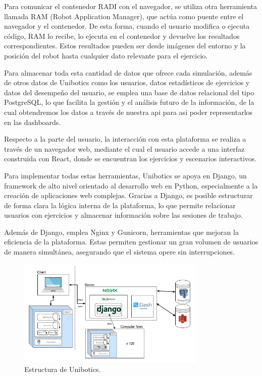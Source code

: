 \documentclass[a4paper, 12pt]{book}
\begin{document}
Para comunicar el contenedor RADI con el navegador, se utiliza otra herramienta llamada RAM (Robot Application Manager), que actúa como puente entre el navegador y el contenedor. De esta forma, cuando el usuario modifica o ejecuta código, RAM lo recibe, lo ejecuta en el contenedor y devuelve los resultados correspondientes. Estos resultados pueden ser desde imágenes del entorno y la posición del robot hasta cualquier dato relevante para el ejercicio. 

Para almacenar toda esta cantidad de datos que ofrece cada simulación, además de otros datos de Unibotics como los usuarios, datos estadísticos de ejercicios y datos del desempeño del usuario, se emplea una base de datos relacional del tipo PostgreSQL, lo que facilita la gestión y el análisis futuro de la información, de la cual obtendremos los datos a través de nuestra api para asi poder representarlos en las dashboards.

Respecto a la parte del usuario, la interacción con esta plataforma se realiza a través de un navegador web, mediante el cual el usuario accede a una interfaz construida con React, donde se encuentran los ejercicios y escenarios interactivos.

Para implementar todas estas herramientas, Unibotics se apoya en Django, un framework de alto nivel orientado al desarrollo web en Python, especialmente a la creación de aplicaciones web complejas. Gracias a Django, es posible estructurar de forma clara la lógica interna de la plataforma, lo que permite relacionar usuarios con ejercicios y almacenar información sobre las sesiones de trabajo.
 
Además de Django, emplea Nginx y Gunicorn, herramientas que mejoran la eficiencia de la plataforma. Estas permiten gestionar un gran volumen de usuarios de manera simultánea, asegurando que el sistema opere sin interrupciones. 

\begin{figure}
  \centering
  \includegraphics[width=9cm, keepaspectratio]{img/arquitectura.png}
  \caption{Estructura de Unibotics.}\label{fig:arquitectura}
\end{figure}
\end{document}
